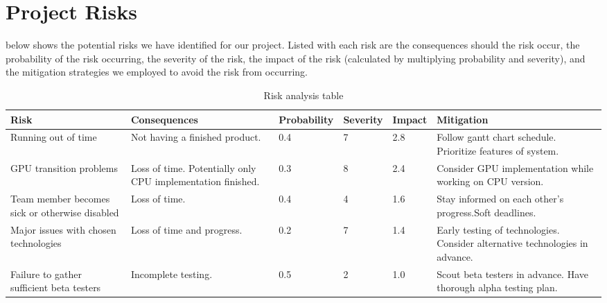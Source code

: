 \chapter{Project Risks}
 below shows the potential risks we have identified for our project. Listed with each risk are the consequences should the risk occur, the probability of the risk occurring, the severity of the risk, the impact of the risk (calculated by multiplying probability and severity), and the mitigation strategies we employed to avoid the risk from occurring.
\newline
\begin{table}[!h]
\def\arraystretch{1.5}
\begin{tabulary}{\textwidth}{|L{2.3cm}|L{2.5cm}|L{2cm}|L{1.5cm}|L{1.3cm}|L{2.9cm}|}
\hline
\textbf{Risk} & \textbf{Consequences} & \textbf{Probability} & \textbf{Severity} & \textbf{Impact} & \textbf{Mitigation} \\
\hline\hline
Running out of time & Not having a finished product. & 0.4 & 7 & 2.8 & Follow gantt chart schedule. Prioritize features of system. \\ \hline
GPU transition problems & Loss of time. Potentially only CPU implementation finished. & 0.3 & 8 & 2.4 & Consider GPU implementation while working on CPU version. \\ \hline
Team member becomes sick or otherwise disabled & Loss of time. & 0.4 & 4 & 1.6 & Stay informed on each other's progress.Soft deadlines. \\ \hline
Major issues with chosen technologies & Loss of time and progress. & 0.2 & 7 & 1.4 & Early testing of technologies. Consider alternative technologies in advance. \\ \hline
Failure to gather sufficient beta testers & Incomplete testing. & 0.5 & 2 & 1.0 & Scout beta testers in advance. Have thorough alpha testing plan. \\ \hline
\end{tabulary}
\caption{Risk analysis table}
\label{table:risks}
\end{table}